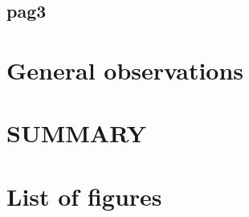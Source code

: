 \documentclass[
12pt, %
a4paper, %
oneside, %
headinclude,footinclude, %
BCOR5mm, %
]{scrartcl}
\begin{document}
	\subsection{pag3}



\section{General observations}



\section{SUMMARY}



\section{List of figures}







% 


\end{document}
